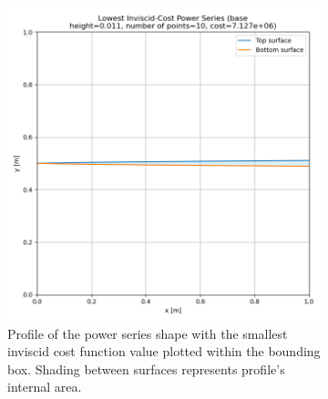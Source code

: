 \documentclass[11pt]{article}
\begin{document}
\begin{figure}[H]
\begin{subfigure}[b]{0.45\textwidth}
    \includegraphics[width=\linewidth]{../results/inviscid/lowest_cost_power_series.png}
    \caption{Profile of the power series shape with the smallest inviscid cost function value plotted within the bounding box. Shading between surfaces represents profile's internal area.}
    \label{fig:inv-power-b}
\end{subfigure}
\caption{}
\label{fig:inv-power}
\end{figure}
\end{document}
